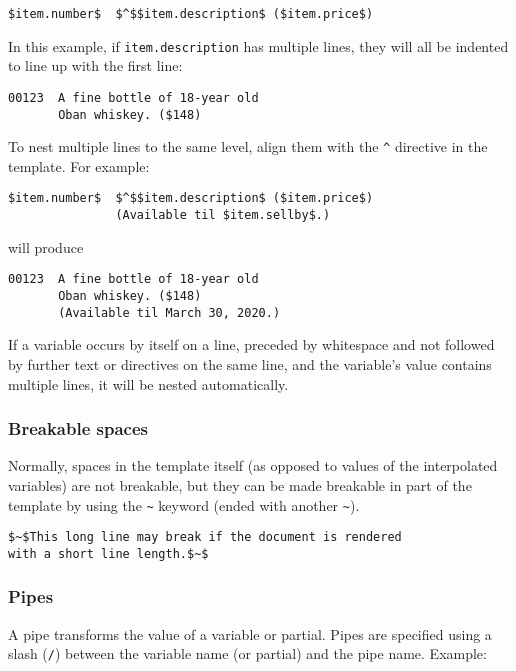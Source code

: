 \documentclass[
]{article}
\begin{document}
\begin{verbatim}
$item.number$  $^$$item.description$ ($item.price$)
\end{verbatim}

In this example, if \texttt{item.description} has multiple lines, they
will all be indented to line up with the first line:

\begin{verbatim}
00123  A fine bottle of 18-year old
       Oban whiskey. ($148)
\end{verbatim}

To nest multiple lines to the same level, align them with the
\texttt{\^{}} directive in the template. For example:

\begin{verbatim}
$item.number$  $^$$item.description$ ($item.price$)
               (Available til $item.sellby$.)
\end{verbatim}

will produce

\begin{verbatim}
00123  A fine bottle of 18-year old
       Oban whiskey. ($148)
       (Available til March 30, 2020.)
\end{verbatim}

If a variable occurs by itself on a line, preceded by whitespace and not
followed by further text or directives on the same line, and the
variable's value contains multiple lines, it will be nested
automatically.

\subsubsection{Breakable spaces}\label{breakable-spaces}

Normally, spaces in the template itself (as opposed to values of the
interpolated variables) are not breakable, but they can be made
breakable in part of the template by using the
\texttt{\textasciitilde{}} keyword (ended with another
\texttt{\textasciitilde{}}).

\begin{verbatim}
$~$This long line may break if the document is rendered
with a short line length.$~$
\end{verbatim}

\subsubsection{Pipes}\label{pipes}

A pipe transforms the value of a variable or partial. Pipes are
specified using a slash (\texttt{/}) between the variable name (or
partial) and the pipe name. Example:
\end{document}
